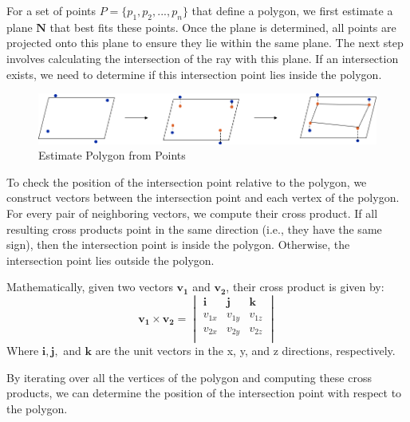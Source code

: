 \documentclass[11pt, a4paper,oneside,chapterprefix=false]{scrbook}
\begin{document}
\vspace{10pt}

For a set of points \( P = \{p_1, p_2, ..., p_n\} \) that define a polygon, we first estimate a plane \( \mathbf{N} \) that best fits these points. Once the plane is determined, all points are projected onto this plane to ensure they lie within the same plane. The next step involves calculating the intersection of the ray with this plane. If an intersection exists, we need to determine if this intersection point lies inside the polygon.

\begin{minipage}{\textwidth}
	\begin{figure}[H]
		\centering
		\includegraphics*[width=1.0\textwidth]{figures/detect openings.png}
		\caption{Estimate Polygon from Points}
		\label{fig:estimate polygon from points}
	\end{figure}
\end{minipage}

To check the position of the intersection point relative to the polygon, we construct vectors between the intersection point and each vertex of the polygon. For every pair of neighboring vectors, we compute their cross product. If all resulting cross products point in the same direction (i.e., they have the same sign), then the intersection point is inside the polygon. Otherwise, the intersection point lies outside the polygon.

\vspace{10pt}

Mathematically, given two vectors \( \mathbf{v_1} \) and \( \mathbf{v_2} \), their cross product is given by:
\[
\mathbf{v_1} \times \mathbf{v_2} = \begin{vmatrix}
\mathbf{i} & \mathbf{j} & \mathbf{k} \\
v_{1x} & v_{1y} & v_{1z} \\
v_{2x} & v_{2y} & v_{2z} \\
\end{vmatrix}
\]
Where \( \mathbf{i}, \mathbf{j}, \) and \( \mathbf{k} \) are the unit vectors in the x, y, and z directions, respectively.

By iterating over all the vertices of the polygon and computing these cross products, we can determine the position of the intersection point with respect to the polygon.
\end{document}
